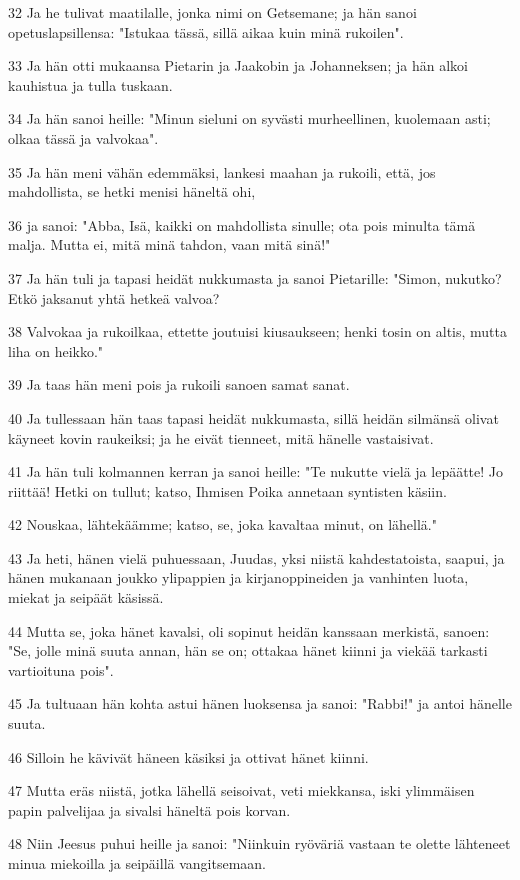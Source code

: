 \par 32 Ja he tulivat maatilalle, jonka nimi on Getsemane; ja hän sanoi opetuslapsillensa: "Istukaa tässä, sillä aikaa kuin minä rukoilen".
\par 33 Ja hän otti mukaansa Pietarin ja Jaakobin ja Johanneksen; ja hän alkoi kauhistua ja tulla tuskaan.
\par 34 Ja hän sanoi heille: "Minun sieluni on syvästi murheellinen, kuolemaan asti; olkaa tässä ja valvokaa".
\par 35 Ja hän meni vähän edemmäksi, lankesi maahan ja rukoili, että, jos mahdollista, se hetki menisi häneltä ohi,
\par 36 ja sanoi: "Abba, Isä, kaikki on mahdollista sinulle; ota pois minulta tämä malja. Mutta ei, mitä minä tahdon, vaan mitä sinä!"
\par 37 Ja hän tuli ja tapasi heidät nukkumasta ja sanoi Pietarille: "Simon, nukutko? Etkö jaksanut yhtä hetkeä valvoa?
\par 38 Valvokaa ja rukoilkaa, ettette joutuisi kiusaukseen; henki tosin on altis, mutta liha on heikko."
\par 39 Ja taas hän meni pois ja rukoili sanoen samat sanat.
\par 40 Ja tullessaan hän taas tapasi heidät nukkumasta, sillä heidän silmänsä olivat käyneet kovin raukeiksi; ja he eivät tienneet, mitä hänelle vastaisivat.
\par 41 Ja hän tuli kolmannen kerran ja sanoi heille: "Te nukutte vielä ja lepäätte! Jo riittää! Hetki on tullut; katso, Ihmisen Poika annetaan syntisten käsiin.
\par 42 Nouskaa, lähtekäämme; katso, se, joka kavaltaa minut, on lähellä."
\par 43 Ja heti, hänen vielä puhuessaan, Juudas, yksi niistä kahdestatoista, saapui, ja hänen mukanaan joukko ylipappien ja kirjanoppineiden ja vanhinten luota, miekat ja seipäät käsissä.
\par 44 Mutta se, joka hänet kavalsi, oli sopinut heidän kanssaan merkistä, sanoen: "Se, jolle minä suuta annan, hän se on; ottakaa hänet kiinni ja viekää tarkasti vartioituna pois".
\par 45 Ja tultuaan hän kohta astui hänen luoksensa ja sanoi: "Rabbi!" ja antoi hänelle suuta.
\par 46 Silloin he kävivät häneen käsiksi ja ottivat hänet kiinni.
\par 47 Mutta eräs niistä, jotka lähellä seisoivat, veti miekkansa, iski ylimmäisen papin palvelijaa ja sivalsi häneltä pois korvan.
\par 48 Niin Jeesus puhui heille ja sanoi: "Niinkuin ryöväriä vastaan te olette lähteneet minua miekoilla ja seipäillä vangitsemaan.
